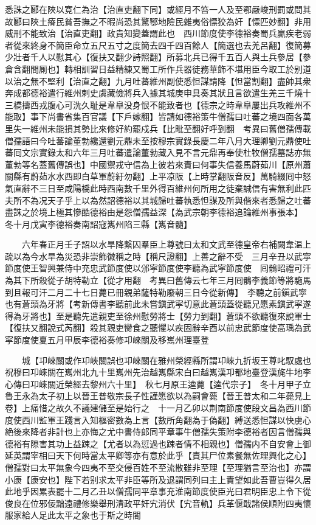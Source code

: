 悉誅之郾在陜以寛仁為治【治直吏翻下同】或經月不笞一人及至鄂嚴峻刑罰或問其故郾曰陜土瘠民貧吾撫之不暇尚恐其驚鄂地險民雜夷俗慓狡為奸【慓匹妙翻】非用威刑不能致治【治直吏翻】政貴知變蓋謂此也　西川節度使李德裕奏蜀兵羸疾老弱者從來終身不簡臣命立五尺五寸之度簡去四千四百餘人【簡選也去羌呂翻】復簡募少壯者千人以慰其心【復扶又翻少詩照翻】所募北兵已得千五百人與土兵參居【參倉含翻間厠也】轉相訓習日益精練又蜀工所作兵器徒務華飾不堪用臣今取工於别道以治之無不堅利【治直之翻】九月吐蕃維州副使悉怛謀請降【怛當割翻】盡帥其衆奔成都德裕遣行維州刺史虞藏儉將兵入據其城庚申具奏其狀且言欲遣生羌三千燒十三橋擣西戎腹心可洗久耻是韋臯没身恨不能致者也【德宗之時韋臯屢出兵攻維州不能取】事下尚書省集百官議【下戶嫁翻】皆請如德裕策牛僧孺曰吐蕃之境四面各萬里失一維州未能損其勢比來修好約罷戍兵【比毗至翻好呼到翻　考異曰舊僧孺傳載僧孺語曰今吐蕃論董勃纔還劉元鼎未至按穆宗實錄長慶二年八月大理卿劉元鼎使吐蕃囘文宗實錄太和六年三月吐蕃遣論董勃藏入見不言元鼎再奉使杜牧僧孺墓誌亦無董勃等名蓋舊傳誤也】中國禦戎守信為上彼若來責曰何事失信養馬蔚茹川【原州蕭關縣有蔚茹水水西即白草軍蔚紆勿翻】上平凉阪【上時掌翻阪音反】萬騎綴囘中怒氣直辭不三日至咸陽橋此時西南數千里外得百維州何所用之徒棄誠信有害無利此匹夫所不為况天子乎上以為然詔德裕以其城歸吐蕃執悉怛謀及所與偕來者悉歸之吐蕃盡誅之於境上極其慘酷德裕由是怨僧孺益深【為武宗朝李德裕追論維州事張本】　冬十月戊寅李德裕奏南詔寇嶲州陷三縣【嶲音髓】

　　六年春正月壬子詔以水旱降繫囚羣臣上尊號曰太和文武至德皇帝右補闕韋温上疏以為今水旱為災恐非崇飾徽稱之時【稱尺證翻】上善之辭不受　三月辛丑以武寜節度使王智興兼侍中充忠武節度使以邠寜節度使李聽為武寜節度使　囘鶻昭禮可汗為其下所殺從子胡特勒立【從才用翻　考異曰舊傳云七年三月囘鶻李義節等將駞馬到且報可汗二月二十七日薨已冊親弟薩特勒廢朝三日今從新傳】　李聽之前鎭武寜也有蒼頭為牙將【考新傳書李聽前此未嘗鎭武寜切意此蒼頭蓋從聽兄愿素鎭武寜遂得為牙將也】至是聽先遣親吏至徐州慰勞將士【勞力到翻】蒼頭不欲聽復來說軍士【復扶又翻說式芮翻】殺其親吏臠食之聽懼以疾固辭辛酉以前忠武節度使高瑀為武寜節度使夏五月甲辰李德裕奏修卭崍關及移嶲州理臺登

　　城【卭崍關或作卭峽關誤也卭崍關在雅州榮經縣所謂卭崍九折坂王尊叱馭處也祝穆曰卭崍關在嶲州北九十里嶲州先治越嶲縣宋白曰越嶲漢卭都地臺登漢旄牛地李心傳曰卭崍關近榮經去黎州六十里】　秋七月原王逵薨【逵代宗子】　冬十月甲子立魯王永為太子初上以晉王普敬宗長子性謹愿欲以為嗣會薨【晉王普太和二年薨見上卷】上痛惜之故久不議建儲至是始行之　十一月乙卯以荆南節度使段文昌為西川節度使西川監軍王踐言入知樞密數為上言【數所角翻為于偽翻】縛送悉怛謀以快虜心絶後來降者非計也上亦悔之尤中書侍郎同平章事牛僧孺失策附李德裕者因言僧孺與德裕有隙害其功上益踈之【尤者以為愆過也踈者情不相親也】僧孺内不自安會上御延英謂宰相曰天下何時當太平卿等亦有意於此乎【責其尸位素餐無佐理興化之心】僧孺對曰太平無象今四夷不至交侵百姓不至流散雖非至理【至理猶言至治也】亦謂小康【康安也】陛下若别求太平非臣等所及退謂同列曰主上責望如此吾曹豈得久居此地乎因累表罷十二月乙丑以僧孺同平章事充淮南節度使臣光曰君明臣忠上令下從俊良在位邪佞黜遠禮修樂舉刑清政平奸宄消伏【宄音軌】兵革偃戢諸侯順附四夷懷服家給人足此太平之象也于斯之時閽

